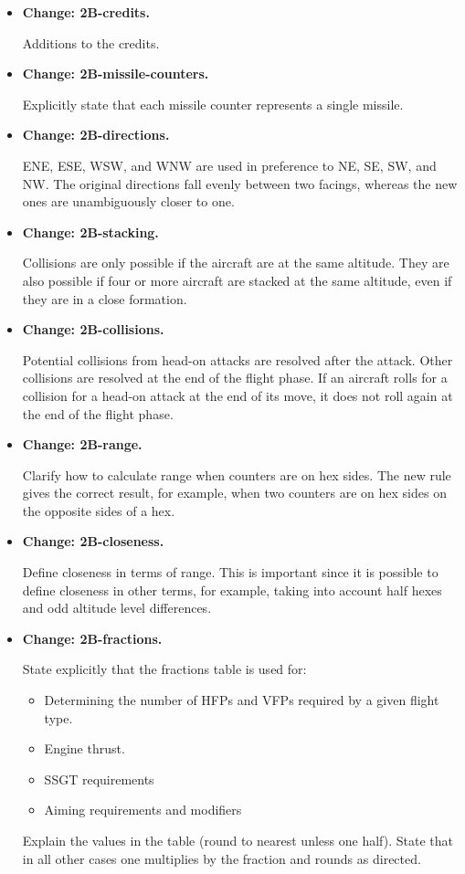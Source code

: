 \documentclass{report}
\newcommand{\changetag}[1]{\textbf{Change: #1.}\par}
\begin{document}
\begin{itemize}

    \item\changetag{2B-credits}

        Additions to the credits.

    \item\changetag{2B-missile-counters}

        Explicitly state that each missile counter represents a single missile.

    \item\changetag{2B-directions}

        ENE, ESE, WSW, and WNW are used in preference to NE, SE, SW, and NW. The original directions fall evenly between two  facings, whereas the new  ones are unambiguously closer to one.

    \item\changetag{2B-stacking}

        Collisions are only possible if the aircraft are at the same altitude. They are also possible if four or more aircraft are stacked at the same altitude, even if they are in a close formation.

    \item\changetag{2B-collisions}

        Potential collisions from head-on attacks are resolved after the attack. Other collisions are resolved at the end of the flight phase. If an aircraft rolls for a collision for a head-on attack at the end of its move, it does not roll again at the end of the flight phase.

    \item\changetag{2B-range}

        Clarify how to calculate range when counters are on hex sides. The new rule gives the correct result, for example, when two counters are on hex sides on the opposite sides of a hex.

    \item\changetag{2B-closeness}

        Define closeness in terms of range. This is important since it is possible to define closeness in other terms, for example, taking into account half hexes and odd altitude level differences.

    \item\changetag{2B-fractions}

        State explicitly that the fractions table is used for:
        \begin{itemize}
            \item Determining the number of HFPs and VFPs required by a given flight type.
            \item Engine thrust.
            \item SSGT requirements
            \item Aiming requirements and modifiers
        \end{itemize}
        Explain the values in the table (round to nearest unless one half). State that in all other cases one multiplies by the fraction and rounds as directed.


\end{itemize}
\end{document}
